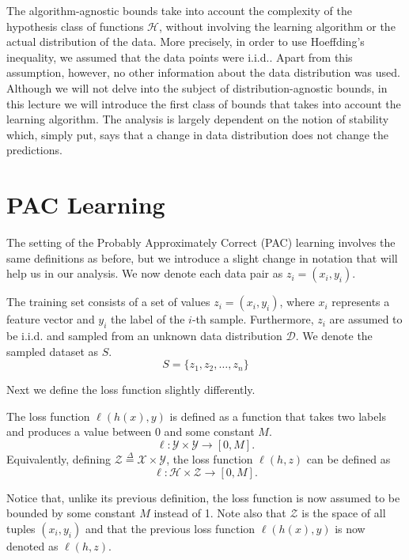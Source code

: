 \documentclass{article}
\begin{document}
The algorithm-agnostic bounds take into account the complexity of the hypothesis class of functions $\mathcal{H}$, without involving the learning algorithm or the actual distribution of the data. More precisely, in order to use Hoeffding's inequality, we assumed that the data points were i.i.d.. Apart from this assumption, however, no other information about the data distribution was used. \\


Although we will not delve into the subject of distribution-agnostic bounds, in this lecture we will introduce the first class of bounds that takes into account the learning algorithm. The analysis is largely dependent on the notion of stability which, simply put, says that a change in data distribution does not change the predictions. 



\section{PAC Learning}
The setting of the Probably Approximately Correct (PAC) learning involves the same definitions as before, but we introduce a slight change in notation that will help us in our analysis. We now denote each data pair as $z_i=(x_i,y_i)$.

\begin{defn}
The training set consists of a set of values $z_i=(x_i,y_i)$, where $x_i$ represents a feature vector and $y_i$ the label of the $i$-th sample. Furthermore, $z_i$ are assumed to be i.i.d. and sampled from an unknown data distribution $\mathcal{D}$. We denote the sampled dataset as $S$. 
\[
	S = \{z_1, z_2, \dots, z_n\}
\]
\end{defn}
 Next we define the loss function slightly differently. 
\begin{defn} The loss function $\ell(h(x),y)$ is defined as a function that takes two labels and produces a value between $0$ and some constant $M$. 
\[
	\ell: \mathcal{Y} \times \mathcal{Y} \longrightarrow [0,M].
\]
Equivalently, defining $\mathcal{Z}\overset{\Delta}{=}\mathcal{X}\times \mathcal{Y}$,  the loss function $\ell (h,z)$  can be defined as 
\[
	\ell: \mathcal{H} \times \mathcal{Z} \longrightarrow [0,M].
\]
\end{defn}
Notice that, unlike its previous definition, the loss function is now assumed to be bounded by some constant $M$ instead of 1. 
Note also that $\mathcal{Z}$ is the space of all tuples $(x_i,y_i) $ and that the previous loss function $\ell(h(x),y)$ is now denoted as $\ell(h,z)$.
\end{document}
